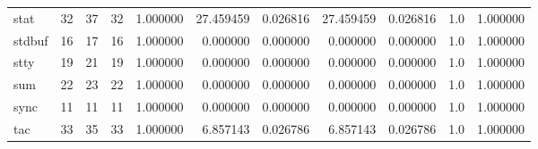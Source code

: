 \begin{longtable}{lrrrrrrrrrr}
stat      &                                      32 &                 37 &                                32 &                                   1.000000 &                              27.459459 &                                     0.026816 &                         27.459459 &                                0.026816 &                                1.0 &                                           1.000000 \\
stdbuf    &                                      16 &                 17 &                                16 &                                   1.000000 &                               0.000000 &                                     0.000000 &                          0.000000 &                                0.000000 &                                1.0 &                                           1.000000 \\
stty      &                                      19 &                 21 &                                19 &                                   1.000000 &                               0.000000 &                                     0.000000 &                          0.000000 &                                0.000000 &                                1.0 &                                           1.000000 \\
sum       &                                      22 &                 23 &                                22 &                                   1.000000 &                               0.000000 &                                     0.000000 &                          0.000000 &                                0.000000 &                                1.0 &                                           1.000000 \\
sync      &                                      11 &                 11 &                                11 &                                   1.000000 &                               0.000000 &                                     0.000000 &                          0.000000 &                                0.000000 &                                1.0 &                                           1.000000 \\
tac       &                                      33 &                 35 &                                33 &                                   1.000000 &                               6.857143 &                                     0.026786 &                          6.857143 &                                0.026786 &                                1.0 &                                           1.000000 \\

\end{longtable}
